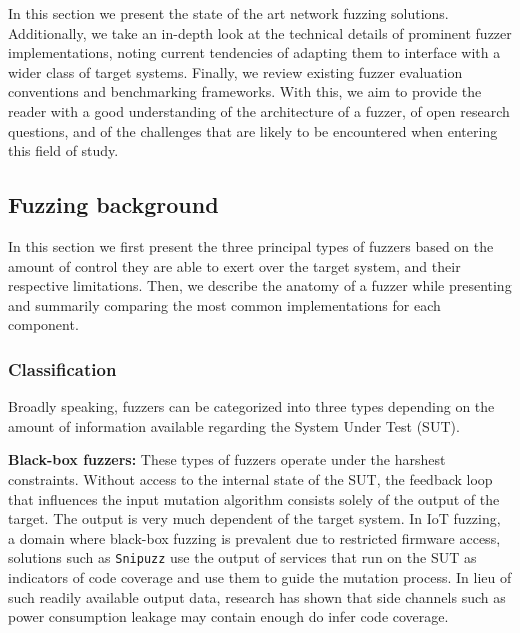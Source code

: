 In this section we present the state of the art network fuzzing solutions. Additionally, we take an in-depth look at the technical details of prominent fuzzer implementations, noting current tendencies of adapting them to interface with a wider class of target systems. Finally, we review existing fuzzer evaluation conventions and benchmarking frameworks. With this, we aim to provide the reader with a good understanding of the architecture of a fuzzer, of open research questions, and of the challenges that are likely to be encountered when entering this field of study.

\subsection{Fuzzing background}
\label{extend:netfuzz:background}

In this section we first present the three principal types of fuzzers based on the amount of control they are able to exert over the target system, and their respective limitations. Then, we describe the anatomy of a fuzzer while presenting and summarily comparing the most common implementations for each component.

\subsubsection{Classification}
\label{extend:netfuzz:classification}

Broadly speaking, fuzzers can be categorized into three types depending on the amount of information available regarding the System Under Test (SUT).

\textbf{Black-box fuzzers:} These types of fuzzers operate under the harshest constraints. Without access to the internal state of the SUT, the feedback loop that influences the input mutation algorithm consists solely of the output of the target. The output is very much dependent of the target system. In IoT fuzzing, a domain where black-box fuzzing is prevalent due to restricted firmware access, solutions such as \texttt{Snipuzz} \cite{feng2021snipuzz} use the output of services that run on the SUT as indicators of code coverage and use them to guide the mutation process. In lieu of such readily available output data, research has shown \cite{sperl2019side} that side channels such as power consumption leakage may contain enough do infer code coverage.

